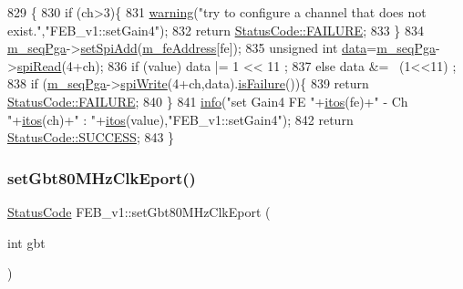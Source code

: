 \begin{DoxyCode}
829                                                        \{
830   \textcolor{keywordflow}{if} (ch>3)\{
831     \hyperlink{classObject_a65cd4fda577711660821fd2cd5a3b4c9}{warning}(\textcolor{stringliteral}{"try to configure a channel that does not exist."},\textcolor{stringliteral}{"FEB\_v1::setGain4"});
832     \textcolor{keywordflow}{return} \hyperlink{classStatusCode_a6f565cbeadc76d14c72f047e5e85eb4ba3da73d4c469762eb9d3c960368252b26}{StatusCode::FAILURE};
833   \}
834   \hyperlink{classFEB__v1_a6c7804ac86796f233a8393043adf2e77}{m\_seqPga}->\hyperlink{classSeqPGA_ac998ce3a6d9b5f2e88cc8393f8c1df53}{setSpiAdd}(\hyperlink{classFEB__v1_a4e1945c2d5b434125f375e9d0fc6d99f}{m\_feAddress}[fe]);
835   \textcolor{keywordtype}{unsigned} \textcolor{keywordtype}{int} \hyperlink{classFEB__v1_a6bca4320bd3bbbc32efc81097f33421a}{data}=\hyperlink{classFEB__v1_a6c7804ac86796f233a8393043adf2e77}{m\_seqPga}->\hyperlink{classSeqPGA_ab3d0e5e5d4014bc7a92588a76b8713d4}{spiRead}(4+ch);
836   \textcolor{keywordflow}{if} (value)  data |= 1 << 11 ;
837   \textcolor{keywordflow}{else}        data &= ~(1<<11) ;
838   \textcolor{keywordflow}{if} (\hyperlink{classFEB__v1_a6c7804ac86796f233a8393043adf2e77}{m\_seqPga}->\hyperlink{classSeqPGA_ad4421841ce4ce8b88ad13f63216f0743}{spiWrite}(4+ch,data).\hyperlink{classStatusCode_a5dd22dc6eb2c52fc4cabc58f6dea2eb7}{isFailure}())\{
839     \textcolor{keywordflow}{return} \hyperlink{classStatusCode_a6f565cbeadc76d14c72f047e5e85eb4ba3da73d4c469762eb9d3c960368252b26}{StatusCode::FAILURE};
840   \}
841   \hyperlink{classObject_a644fd329ea4cb85f54fa6846484b84a8}{info}(\textcolor{stringliteral}{"set Gain4 FE "}+\hyperlink{Tools_8h_af330027dbdafb9a30768b3613c553e60}{itos}(fe)+\textcolor{stringliteral}{" - Ch "}+\hyperlink{Tools_8h_af330027dbdafb9a30768b3613c553e60}{itos}(ch)+\textcolor{stringliteral}{" : "}+\hyperlink{Tools_8h_af330027dbdafb9a30768b3613c553e60}{itos}(value),\textcolor{stringliteral}{"FEB\_v1::setGain4"});
842   \textcolor{keywordflow}{return} \hyperlink{classStatusCode_a6f565cbeadc76d14c72f047e5e85eb4badd0da38d3ba0d922efd1f4619bc37ad8}{StatusCode::SUCCESS};
843 \}
\end{DoxyCode}
\mbox{\label{classFEB__v1_a6efa59ad9f80ae40aad2df0b925b0b14}} 
\subsubsection{\texorpdfstring{set\+Gbt80\+M\+Hz\+Clk\+Eport()}{setGbt80MHzClkEport()}}
{\footnotesize\ttfamily \hyperlink{classStatusCode}{Status\+Code} F\+E\+B\+\_\+v1\+::set\+Gbt80\+M\+Hz\+Clk\+Eport (\begin{DoxyParamCaption}\item[{int}]{gbt }\end{DoxyParamCaption})}



